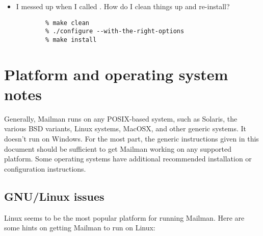\documentclass{howto}
\begin{document}
\begin{itemize}
\item {}  I messed up when I called .  How
      do I clean things up and re-install?


      \begin{verbatim}
        % make clean
        % ./configure --with-the-right-options
        % make install
      \end{verbatim}

\end{itemize}

\section{Platform and operating system notes}

Generally, Mailman runs on any POSIX-based system, such as Solaris, the
various BSD variants, Linux systems, MacOSX, and other generic \UNIX{}
systems.  It doesn't run on Windows.  For the most part, the generic
instructions given in this document should be sufficient to get Mailman
working on any supported platform.  Some operating systems have additional
recommended installation or configuration instructions.

\subsection{GNU/Linux issues}

Linux seems to be the most popular platform for running Mailman.  Here are
some hints on getting Mailman to run on Linux:
\end{document}
